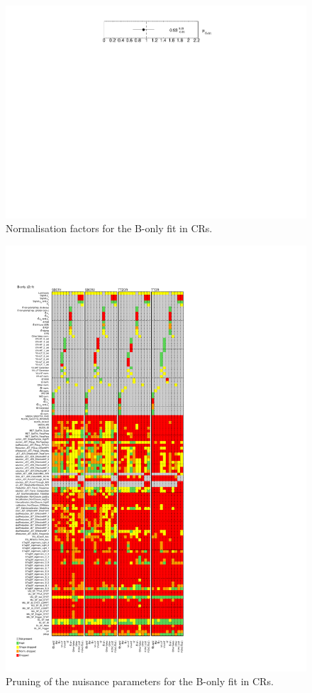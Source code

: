 \begin{figure}[!htbp]
	\centering
	\includegraphics[width=.56\textwidth]{Chapters/CH7/figures/BONLY_CR_UsingDL1rcFullSys/NormFactors}
	\caption{Normalisation factors for the B-only \tZc fit in CRs.}%
	\label{fig:stat:tzc:bonly:cr:norm}
\end{figure}

\restoregeometry

\begin{figure}[htbp]
	\centering
	\includegraphics[width=.65\textwidth]{Chapters/CH7/figures/BONLY_CR_UsingDL1rcFullSys/Pruning}
	\caption{Pruning of the nuisance parameters for the B-only \tZc fit in CRs.}%
	\label{fig:stat:tzc:bonly:cr:pruning}
\end{figure}

